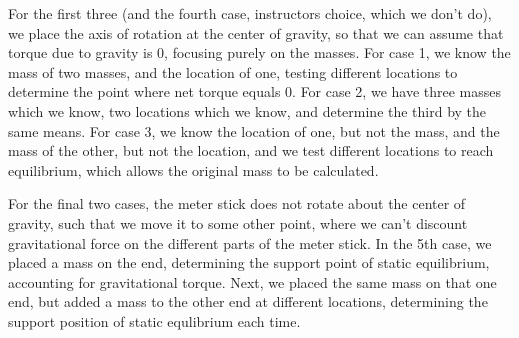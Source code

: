 \documentclass[11pt, titlepage]{article}
\begin{document}
For the first three (and the fourth case, instructors choice, which we don't do), we place the axis of rotation at the center of gravity, so that we can assume that torque due to gravity is 0, focusing purely on the masses. For case 1, we know the mass of two masses, and the location of one, testing different locations to determine the point where net torque equals 0. For case 2, we have three masses which we know, two locations which we know, and determine the third by the same means. For case 3, we know the location of one, but not the mass, and the mass of the other, but not the location, and we test different locations to reach equilibrium, which allows the original mass to be calculated.

For the final two cases, the meter stick does not rotate about the center of gravity, such that we move it to some other point, where we can't discount gravitational force on the different parts of the meter stick. In the 5th case, we placed a mass on the end, determining the support point of static equilibrium, accounting for gravitational torque. Next, we placed the same mass on that one end, but added a mass to the other end at different locations, determining the support position of static equlibrium each time.
\end{document}

